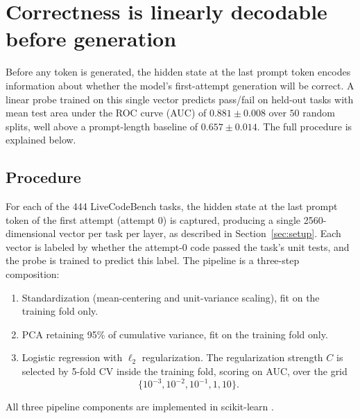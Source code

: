 \section{Correctness is linearly decodable before generation}
\label{sec:probe_results}
Before any token is generated, the hidden state at the last prompt token encodes information about whether the model's first-attempt generation will be correct. A linear probe trained on this single vector predicts pass/fail on held-out tasks with mean test area under the ROC curve (AUC) of $0.881 \pm 0.008$ over $50$ random splits, well above a prompt-length baseline of $0.657 \pm 0.014$. The full procedure is explained below.

\subsection{Procedure}

For each of the 444 LiveCodeBench tasks, the hidden state at the last prompt token of the first attempt (attempt 0) is captured, producing a single 2560-dimensional vector per task per layer, as described in Section~\ref{sec:setup}. Each vector is labeled by whether the attempt-0 code passed the task's unit tests, and the probe is trained to predict this label. The pipeline is a three-step composition:
\begin{enumerate}
    \item Standardization (mean-centering and unit-variance scaling), fit on the training fold only.
    \item PCA retaining 95\% of cumulative variance, fit on the training fold only.
    \item Logistic regression with $\ell_2$ regularization. The regularization strength $C$ is selected by 5-fold CV inside the training fold, scoring on AUC, over the grid
    \[
        \{10^{-3}, 10^{-2}, 10^{-1}, 1, 10\}.
    \]
\end{enumerate}

All three pipeline components are implemented in scikit-learn \citep{pedregosa2011sklearn}.

